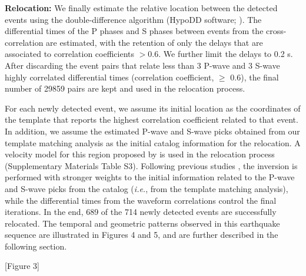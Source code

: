 \documentclass[a4paper,12pt,twoside]{article}
\begin{document}
{\bf Relocation:} We finally estimate the relative location between the detected events using the double-difference algorithm (HypoDD software; \cite{Waldhauser_2001_HDD}). The differential times of the P phases and S phases between events from the cross-correlation are estimated, with the retention of only the delays that are associated to correlation coefficients $>$0.6. We further limit the delays to 0.2 s. After discarding the event pairs that relate less than 3 P-wave and 3 S-wave highly correlated differential times (correlation coefficient, $\geq$ 0.6), the final number of 29859 pairs are kept and used in the relocation process. 

For each newly detected event, we assume its initial location as the coordinates of the template that reports the highest correlation coefficient related to that event. In addition, we assume the estimated P-wave and S-wave picks obtained from our template matching analysis as the initial catalog information for the relocation. A velocity model for this region proposed by \cite{Bagh_2007_BSC} is used in the relocation process (Supplementary Materials Table S3). Following previous studies \citep{Shelly_2019_IFC}, the inversion is performed with stronger weights to the initial information related to the P-wave and S-wave picks from the catalog (\emph{i.e.}, from the template matching analysis), while the differential times from the waveform correlations control the final iterations. In the end, 689 of the 714 newly detected events are successfully relocated. The temporal and geometric patterns observed in this earthquake sequence are illustrated in Figures 4 and 5, and are further described in the following section.

\begin{center}
   [Figure 3]
\end{center}
\end{document}
